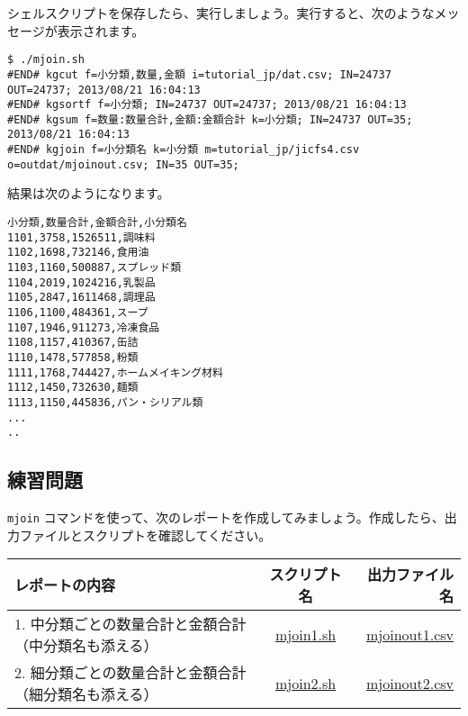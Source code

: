 シェルスクリプトを保存したら、実行しましょう。実行すると、次のようなメッセージが表示されます。\\

\begin{verbatim}
$ ./mjoin.sh
#END# kgcut f=小分類,数量,金額 i=tutorial_jp/dat.csv; IN=24737 OUT=24737; 2013/08/21 16:04:13
#END# kgsortf f=小分類; IN=24737 OUT=24737; 2013/08/21 16:04:13
#END# kgsum f=数量:数量合計,金額:金額合計 k=小分類; IN=24737 OUT=35; 2013/08/21 16:04:13
#END# kgjoin f=小分類名 k=小分類 m=tutorial_jp/jicfs4.csv o=outdat/mjoinout.csv; IN=35 OUT=35;
\end{verbatim}

結果は次のようになります。

\begin{verbatim}
小分類,数量合計,金額合計,小分類名
1101,3758,1526511,調味料
1102,1698,732146,食用油
1103,1160,500887,スプレッド類
1104,2019,1024216,乳製品
1105,2847,1611468,調理品
1106,1100,484361,スープ
1107,1946,911273,冷凍食品
1108,1157,410367,缶詰
1110,1478,577858,粉類
1111,1768,744427,ホームメイキング材料
1112,1450,732630,麺類
1113,1150,445836,パン・シリアル類
...
..
\end{verbatim}

\subsection{練習問題}

\verb|mjoin| コマンドを使って、次のレポートを作成してみましょう。作成したら、出力ファイルとスクリプトを確認してください。

\begin{table}[htbp]
{\small
\begin{tabular}{ l | c || r }
\hline
\textbf{レポートの内容}   & \textbf{スクリプト名} & \textbf{出力ファイル名}  \\
\hline
1. 中分類ごとの数量合計と金額合計（中分類名も添える） & \href{exercise/mjoin1.sh}{mjoin1.sh} & \href{exercise/outdat/mjoinout1.csv}{mjoinout1.csv} \\
2. 細分類ごとの数量合計と金額合計（細分類名も添える） & \href{exercise/mjoin2.sh}{mjoin2.sh} & \href{exercise/outdat/mjoinout2.csv}{mjoinout2.csv} \\

\hline
\end{tabular} 
}
\end{table} 


%
